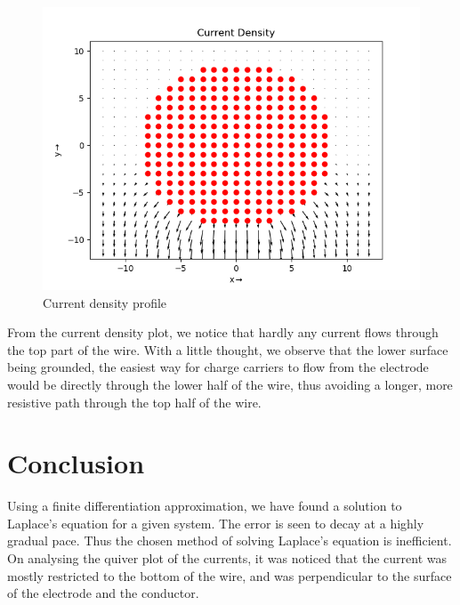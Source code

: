 \documentclass[11pt, a4paper]{article}
\begin{document}
  \begin{figure}[!h]
 \centering
 \includegraphics[scale=0.5]{current.png}
 \caption{Current density profile}
 \end{figure}
 


From the current density plot, we notice that hardly any current flows through the top part of the wire. With a little thought, we observe that the lower surface being grounded, the easiest way for charge carriers to flow from the electrode would be directly through the lower half of the wire, thus avoiding a longer,  more resistive path through the top half of the wire.

\section*{ Conclusion}
Using a finite differentiation approximation, we have found a solution to Laplace's equation for a given system. The error is seen to decay at a highly gradual pace. Thus the chosen method of solving Laplace's equation is inefficient.  On analysing the quiver plot of the currents, it was noticed that the current was mostly restricted to the bottom of the wire, and was perpendicular to the surface of the electrode and the conductor. 
\end{document}
